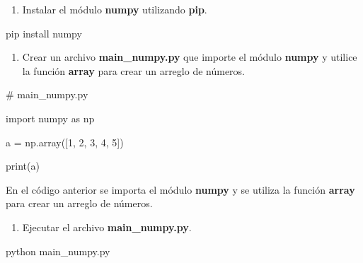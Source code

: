\documentclass[
  a4paper,
  DIV=11,
  numbers=noendperiod,
  onepage,
  openany]{scrreprt}
\newenvironment{Shaded}{\begin{snugshade}}{\end{snugshade}}
\newcommand{\BuiltInTok}[1]{\textcolor[rgb]{0.00,0.23,0.31}{#1}}
\newcommand{\CommentTok}[1]{\textcolor[rgb]{0.37,0.37,0.37}{#1}}
\newcommand{\DecValTok}[1]{\textcolor[rgb]{0.68,0.00,0.00}{#1}}
\newcommand{\ExtensionTok}[1]{\textcolor[rgb]{0.00,0.23,0.31}{#1}}
\newcommand{\ImportTok}[1]{\textcolor[rgb]{0.00,0.46,0.62}{#1}}
\newcommand{\NormalTok}[1]{\textcolor[rgb]{0.00,0.23,0.31}{#1}}
\newcommand{\OperatorTok}[1]{\textcolor[rgb]{0.37,0.37,0.37}{#1}}
\providecommand{\tightlist}{%
  \setlength{\itemsep}{0pt}\setlength{\parskip}{0pt}}\usepackage{longtable,booktabs,array}
\begin{document}
\begin{enumerate}
\def\labelenumi{\arabic{enumi}.}
\setcounter{enumi}{3}
\tightlist
\item
  Instalar el módulo \textbf{numpy} utilizando \textbf{pip}.
\end{enumerate}

\begin{Shaded}
\begin{Highlighting}[]
\ExtensionTok{pip}\NormalTok{ install numpy}
\end{Highlighting}
\end{Shaded}

\begin{enumerate}
\def\labelenumi{\arabic{enumi}.}
\setcounter{enumi}{4}
\tightlist
\item
  Crear un archivo \textbf{main\_numpy.py} que importe el módulo
  \textbf{numpy} y utilice la función \textbf{array} para crear un
  arreglo de números.
\end{enumerate}

\begin{Shaded}
\begin{Highlighting}[]

\CommentTok{\# main\_numpy.py}

\ImportTok{import}\NormalTok{ numpy }\ImportTok{as}\NormalTok{ np}

\NormalTok{a }\OperatorTok{=}\NormalTok{ np.array([}\DecValTok{1}\NormalTok{, }\DecValTok{2}\NormalTok{, }\DecValTok{3}\NormalTok{, }\DecValTok{4}\NormalTok{, }\DecValTok{5}\NormalTok{])}

\BuiltInTok{print}\NormalTok{(a)}
\end{Highlighting}
\end{Shaded}

En el código anterior se importa el módulo \textbf{numpy} y se utiliza
la función \textbf{array} para crear un arreglo de números.

\begin{enumerate}
\def\labelenumi{\arabic{enumi}.}
\setcounter{enumi}{5}
\tightlist
\item
  Ejecutar el archivo \textbf{main\_numpy.py}.
\end{enumerate}

\begin{Shaded}
\begin{Highlighting}[]
\ExtensionTok{python}\NormalTok{ main\_numpy.py}
\end{Highlighting}
\end{Shaded}
\end{document}
